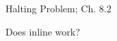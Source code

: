 \documentclass[handout]{mcs}
\begin{document}

\begin{staffnotes}
	Halting Problem;  Ch. 8.2
\end{staffnotes}

\begin{problem}
Does inline work?
\end{problem}







\end{document}
